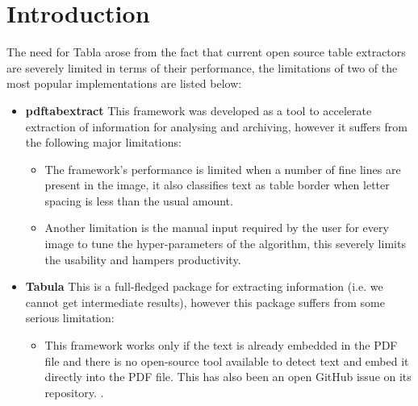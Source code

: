 \documentclass[10pt,journal,compsoc]{IEEEtran}
\begin{document}
%
\IEEEpeerreviewmaketitle



\newcommand{\inline}[1]{\texttt{#1}}
    
\section{Introduction}
The need for Tabla arose from the fact that current open source table extractors are severely limited in terms of their performance, the limitations of two of the most popular implementations are listed below:

\begin{itemize}
\item \textbf{pdftabextract}\cite{Konrad2017GitHub, Konrad2017Blog} This framework was developed as a tool to accelerate extraction of information for analysing and archiving, however it suffers from the following major limitations:
\begin{itemize}
    \item The framework's performance is limited when a number of fine lines are present in the image, it also classifies text as table border when letter spacing is less than the usual amount.
    \item Another limitation is the manual input required by the user for every image to tune the hyper-parameters of the algorithm, this severely limits the usability and hampers productivity.
\end{itemize}

\item \textbf{Tabula}\cite{tabula2018} This is a full-fledged package for extracting information (i.e. we cannot get intermediate results), however this package suffers from some serious limitation:
\begin{itemize}
    \item This framework works only if the text is already embedded in the PDF file and there is no open-source tool available to detect text and embed it directly into the PDF file. This has also been an open GitHub issue on its repository. \cite{tabula2018issue}.
\end{itemize}
\end{itemize}
\end{document}
